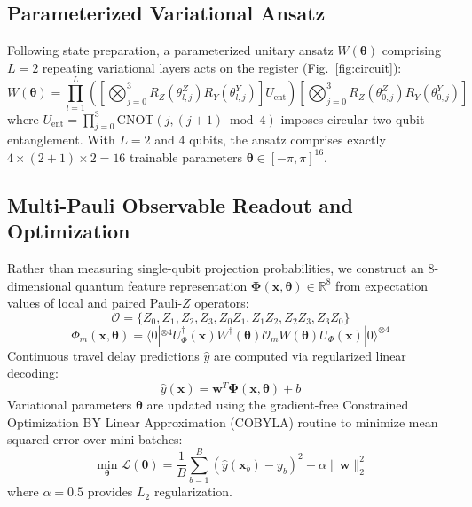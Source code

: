 \documentclass{llncs}
\begin{document}
\subsection{Parameterized Variational Ansatz}
Following state preparation, a parameterized unitary ansatz $W(\bm{\theta})$ comprising $L = 2$ repeating variational layers acts on the register (Fig.~\ref{fig:circuit}):
\begin{equation}
W(\bm{\theta}) = \prod_{l=1}^{L} \left( \left[ \bigotimes_{j=0}^{3} R_Z(\theta_{l, j}^Z) R_Y(\theta_{l, j}^Y) \right] U_{\text{ent}} \right) \left[ \bigotimes_{j=0}^{3} R_Z(\theta_{0, j}^Z) R_Y(\theta_{0, j}^Y) \right]
\end{equation}
where $U_{\text{ent}} = \prod_{j=0}^{3} \text{CNOT}(j, (j+1) \bmod 4)$ imposes circular two-qubit entanglement. With $L = 2$ and 4 qubits, the ansatz comprises exactly $4 \times (2 + 1) \times 2 = 16$ trainable parameters $\bm{\theta} \in [-\pi, \pi]^{16}$.

\subsection{Multi-Pauli Observable Readout and Optimization}
Rather than measuring single-qubit projection probabilities, we construct an 8-dimensional quantum feature representation $\bm{\Phi}(\mathbf{x}, \bm{\theta}) \in \mathbb{R}^8$ from expectation values of local and paired Pauli-$Z$ operators:
\begin{equation}
\mathcal{O} = \{Z_0, Z_1, Z_2, Z_3, Z_0 Z_1, Z_1 Z_2, Z_2 Z_3, Z_3 Z_0\}
\end{equation}
\begin{equation}
\Phi_m(\mathbf{x}, \bm{\theta}) = \langle 0|^{\otimes 4} U_{\Phi}^{\dagger}(\mathbf{x}) W^{\dagger}(\bm{\theta}) \mathcal{O}_m W(\bm{\theta}) U_{\Phi}(\mathbf{x}) |0\rangle^{\otimes 4}
\end{equation}
Continuous travel delay predictions $\hat{y}$ are computed via regularized linear decoding:
\begin{equation}
\hat{y}(\mathbf{x}) = \mathbf{w}^T \bm{\Phi}(\mathbf{x}, \bm{\theta}) + b
\end{equation}
Variational parameters $\bm{\theta}$ are updated using the gradient-free Constrained Optimization BY Linear Approximation (COBYLA) routine to minimize mean squared error over mini-batches:
\begin{equation}
\min_{\bm{\theta}} \mathcal{L}(\bm{\theta}) = \frac{1}{B} \sum_{b=1}^{B} \left( \hat{y}(\mathbf{x}_b) - y_b \right)^2 + \alpha \|\mathbf{w}\|_2^2
\end{equation}
where $\alpha = 0.5$ provides $L_2$ regularization.
\end{document}
